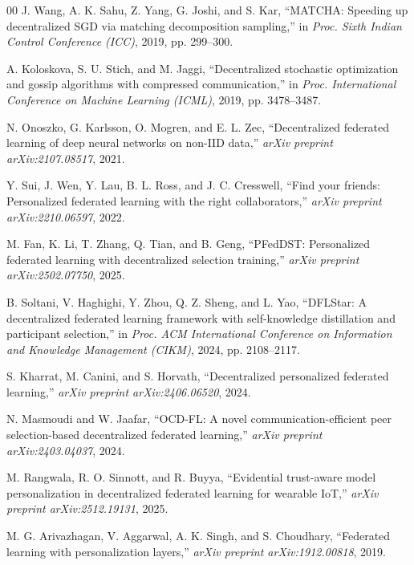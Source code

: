 \documentclass[conference]{IEEEtran}
\begin{document}
\begin{thebibliography}{00}
J. Wang, A. K. Sahu, Z. Yang, G. Joshi, and S. Kar, ``MATCHA: Speeding up decentralized SGD via matching decomposition sampling,'' in \emph{Proc. Sixth Indian Control Conference (ICC)}, 2019, pp. 299--300.

A. Koloskova, S. U. Stich, and M. Jaggi, ``Decentralized stochastic optimization and gossip algorithms with compressed communication,'' in \emph{Proc. International Conference on Machine Learning (ICML)}, 2019, pp. 3478--3487.

N. Onoszko, G. Karlsson, O. Mogren, and E. L. Zec, ``Decentralized federated learning of deep neural networks on non-IID data,'' \emph{arXiv preprint arXiv:2107.08517}, 2021.

Y. Sui, J. Wen, Y. Lau, B. L. Ross, and J. C. Cresswell, ``Find your friends: Personalized federated learning with the right collaborators,'' \emph{arXiv preprint arXiv:2210.06597}, 2022.

M. Fan, K. Li, T. Zhang, Q. Tian, and B. Geng, ``PFedDST: Personalized federated learning with decentralized selection training,'' \emph{arXiv preprint arXiv:2502.07750}, 2025.

B. Soltani, V. Haghighi, Y. Zhou, Q. Z. Sheng, and L. Yao, ``DFLStar: A decentralized federated learning framework with self-knowledge distillation and participant selection,'' in \emph{Proc. ACM International Conference on Information and Knowledge Management (CIKM)}, 2024, pp. 2108--2117.

S. Kharrat, M. Canini, and S. Horvath, ``Decentralized personalized federated learning,'' \emph{arXiv preprint arXiv:2406.06520}, 2024.

N. Masmoudi and W. Jaafar, ``OCD-FL: A novel communication-efficient peer selection-based decentralized federated learning,'' \emph{arXiv preprint arXiv:2403.04037}, 2024.

M. Rangwala, R. O. Sinnott, and R. Buyya, ``Evidential trust-aware model personalization in decentralized federated learning for wearable IoT,'' \emph{arXiv preprint arXiv:2512.19131}, 2025.

M. G. Arivazhagan, V. Aggarwal, A. K. Singh, and S. Choudhary, ``Federated learning with personalization layers,'' \emph{arXiv preprint arXiv:1912.00818}, 2019.


\end{thebibliography}
\end{document}
